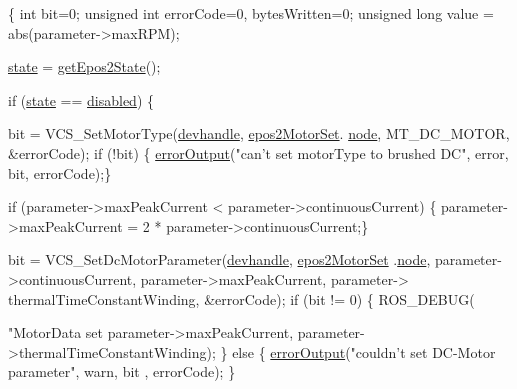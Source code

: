 \begin{DoxyCode}
\{
    \textcolor{keywordtype}{int} bit=0;
    \textcolor{keywordtype}{unsigned} \textcolor{keywordtype}{int} errorCode=0, bytesWritten=0;
    \textcolor{keywordtype}{unsigned} \textcolor{keywordtype}{long} value = abs(parameter->maxRPM);

    \hyperlink{classEpos2MotorController_a7194b8efd4f2fd5a4d64b10135c416e2}{state} = \hyperlink{classEpos2MotorController_ac6c31e0dc57485aa817431b22627fc70}{getEpos2State}();

    \textcolor{keywordflow}{if} (\hyperlink{classEpos2MotorController_a7194b8efd4f2fd5a4d64b10135c416e2}{state} == \hyperlink{classEpos2MotorController_ab5ec630dfbb90ad674e311187926060caf0eea74682d3d3f21bec6e5b376cf443}{disabled}) \{

        bit = VCS\_SetMotorType(\hyperlink{classEpos2MotorController_a40594faab444bcba221ab9d55d1162cd}{devhandle}, \hyperlink{classEpos2MotorController_a0856f5fdd71ffa3b84a536afa085bfb1}{epos2MotorSet}.
      \hyperlink{structEpos2MotorController_1_1epos2Settings_ab8f18d3df17e8de9ed5250a3e53292c6}{node}, MT\_DC\_MOTOR, &errorCode);
        \textcolor{keywordflow}{if} (!bit) \{ \hyperlink{classEpos2MotorController_a64d5e3e3858597c111e60ba8b382a63b}{errorOutput}(\textcolor{stringliteral}{"can't set motorType to brushed DC"},
       error, bit, errorCode);\}

        \textcolor{keywordflow}{if} (parameter->maxPeakCurrent < parameter->continuousCurrent) \{ 
      parameter->maxPeakCurrent = 2 * parameter->continuousCurrent;\}

        bit = VCS\_SetDcMotorParameter(\hyperlink{classEpos2MotorController_a40594faab444bcba221ab9d55d1162cd}{devhandle}, \hyperlink{classEpos2MotorController_a0856f5fdd71ffa3b84a536afa085bfb1}{epos2MotorSet}
      .\hyperlink{structEpos2MotorController_1_1epos2Settings_ab8f18d3df17e8de9ed5250a3e53292c6}{node}, parameter->continuousCurrent, parameter->maxPeakCurrent, parameter->
      thermalTimeConstantWinding, &errorCode);
        \textcolor{keywordflow}{if} (bit != 0) \{
            ROS\_DEBUG(\textcolor{stringliteral}{"MotorData set %
      parameter->maxPeakCurrent, parameter->thermalTimeConstantWinding);
        \} \textcolor{keywordflow}{else} \{
            \hyperlink{classEpos2MotorController_a64d5e3e3858597c111e60ba8b382a63b}{errorOutput}(\textcolor{stringliteral}{"couldn't set DC-Motor parameter"}, warn, bit
      , errorCode);
        \}

}
\end{DoxyCode}
